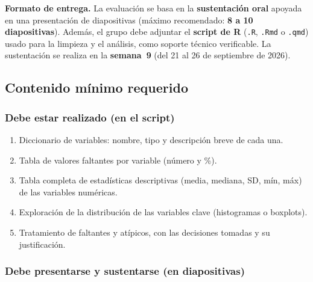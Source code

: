 \documentclass[11pt,letterpaper]{article}
\begin{document}
\textbf{Formato de entrega.} La evaluación se basa en la \textbf{sustentación oral} apoyada en una presentación de diapositivas (máximo recomendado: \textbf{8 a 10 diapositivas}). Además, el grupo debe adjuntar el \textbf{script de R} (\texttt{.R}, \texttt{.Rmd} o \texttt{.qmd}) usado para la limpieza y el análisis, como soporte técnico verificable. La sustentación se realiza en la \textbf{semana~9} (del 21 al 26 de septiembre de 2026).


\subsection{Contenido mínimo requerido}

\subsubsection{Debe estar realizado (en el script)}

\begin{enumerate}
  \item Diccionario de variables: nombre, tipo y descripción breve de cada una.
  \item Tabla de valores faltantes por variable (número y \%).
  \item Tabla completa de estadísticas descriptivas (media, mediana, SD, mín, máx) de las variables numéricas.
  \item Exploración de la distribución de las variables clave (histogramas o boxplots).
  \item Tratamiento de faltantes y atípicos, con las decisiones tomadas y su justificación.
\end{enumerate}

\subsubsection*{Debe presentarse y sustentarse (en diapositivas)}
\end{document}

